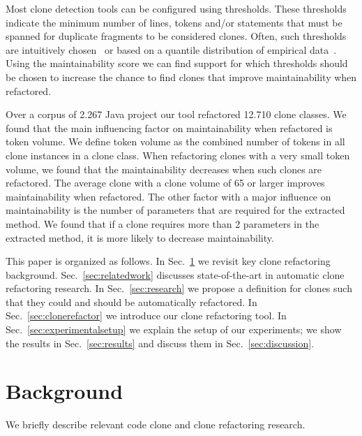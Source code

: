 \documentclass[a4paper,UKenglish,cleveref, autoref, thm-restate,authorcolumns]{lipics-v2019}
\begin{document}
Most clone detection tools can be configured using thresholds. These thresholds indicate the minimum number of lines, tokens and/or statements that must be spanned for duplicate fragments to be considered clones. Often, such thresholds are intuitively chosen~\cite{li2006cp, roy2009mutation} or based on a quantile distribution of empirical data~\cite{alves2010deriving}. Using the maintainability score we can find support for which thresholds should be chosen to increase the chance to find clones that improve maintainability when refactored.%

Over a corpus of 2.267 Java project our tool refactored 12.710 clone classes. We found that the main influencing factor on maintainability when refactored is token volume. We define token volume as the combined number of tokens in all clone instances in a clone class. When refactoring clones with a very small token volume, we found that the maintainability decreases when such clones are refactored. The average clone with a clone volume of 65 or larger improves maintainability when refactored. The other factor with a major influence on maintainability is the number of parameters that are required for the extracted method. We found that if a clone requires more than 2 parameters in the extracted method, it is more likely to decrease maintainability.

This paper is organized as follows. In Sec.~\ref{sec:background} we revisit key clone refactoring background. Sec.~\ref{sec:relatedwork} discusses state-of-the-art in automatic clone refactoring research. In Sec.~\ref{sec:research} we propose a definition for clones such that they could and should be automatically refactored. In Sec.~\ref{sec:clonerefactor} we introduce our clone refactoring tool. In Sec.~\ref{sec:experimentalsetup} we explain the setup of our experiments; we show the results in Sec.~\ref{sec:results} and discuss them in Sec.~\ref{sec:discussion}.

\section{Background}\label{sec:background}
We briefly describe relevant code clone and clone refactoring research.
\end{document}
